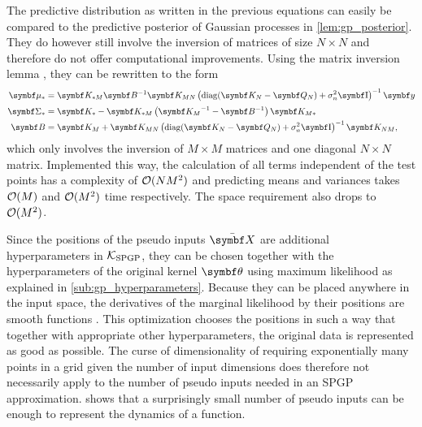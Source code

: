 The predictive distribution as written in the previous equations can easily be compared to the predictive posterior of Gaussian processes in \cref{lem:gp_posterior}.
They do however still involve the inversion of matrices of size $N \times N$ and therefore do not offer computational improvements.
Using the matrix inversion lemma \cite{petersen_matrix_2008}, they can be rewritten to the form
\begin{align}
    \begin{split}
        \mat{\mu_\ast} &= \mat{K_{\ast M}} \mat{B}^{-1} \mat{K_{MN}} \left( \diag(\mat{K_N} - \mat{Q_N}) + \sigma_n^2 \Eye \right)^{-1} \mat{y} \\
        \mat{\Sigma_\ast} &= \mat{K_\ast} - \mat{K_{\ast M}} \left( \mat{K_M}^{-1} - \mat{B}^{-1} \right) \mat{K_{M \ast}}\vphantom{\left(\mat{K_M}^{-1} \right)^{-1}} \\
        \mat{B} &= \mat{K_M} + \mat{K_{MN}} \left( \diag(\mat{K_N} - \mat{Q_N}) + \sigma_n^2 \Eye \right)^{-1} \mat{K_{NM}},
    \end{split}
\end{align}
which only involves the inversion of $M \times M$ matrices and one diagonal $N \times N$ matrix.
Implemented this way, the calculation of all terms independent of the test points has a complexity of $\operatorname{\mathcal{O}}(NM^2)$ and predicting means and variances takes $\operatorname{\mathcal{O}}(M)$ and $\operatorname{\mathcal{O}}(M^2)$ time respectively.
The space requirement also drops to $\operatorname{\mathcal{O}}(M^2)$.

Since the positions of the pseudo inputs $\ps{\mat{X}}$ are additional hyperparameters in $\operatorname{\mathcal{K}}_{\text{SPGP}}$, they can be chosen together with the hyperparameters of the original kernel $\mat{\theta}$ using maximum likelihood as explained in \cref{sub:gp_hyperparameters}.
Because they can be placed anywhere in the input space, the derivatives of the marginal likelihood by their positions are smooth functions \cite{snelson_sparse_2005}.
This optimization chooses the positions in such a way that together with appropriate other hyperparameters, the original data is represented as good as possible.
The curse of dimensionality of requiring exponentially many points in a grid given the number of input dimensions does therefore not necessarily apply to the number of pseudo inputs needed in an SPGP approximation.
 shows that a surprisingly small number of pseudo inputs can be enough to represent the dynamics of a function.

